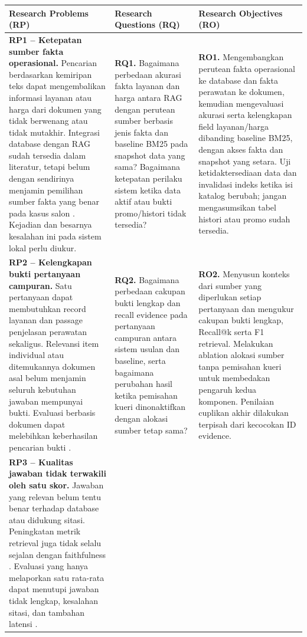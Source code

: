 \documentclass[11pt,a4paper]{article}
\newcommand{\rowcolor}[1]{}
\begin{document}
\begin{landscape}
\vspace{5pt}
\begin{tabularx}{\linewidth}{|>{\raggedright\arraybackslash}X|>{\raggedright\arraybackslash}X|>{\raggedright\arraybackslash}X|}
\hline
\rowcolor{headfill}\textbf{Research Problems (RP)} & \textbf{Research Questions (RQ)} & \textbf{Research Objectives (RO)}\\\hline
\textbf{RP1 -- Ketepatan sumber fakta operasional.}
Pencarian berdasarkan kemiripan teks dapat mengembalikan informasi layanan atau harga dari dokumen yang tidak berwenang atau tidak mutakhir. Integrasi database dengan RAG sudah tersedia dalam literatur, tetapi belum dengan sendirinya menjamin pemilihan sumber fakta yang benar pada kasus salon \cite{burbano,hsueh}. Kejadian dan besarnya kesalahan ini pada sistem lokal perlu diukur.
&
\textbf{RQ1.} Bagaimana perbedaan akurasi fakta layanan dan harga antara RAG dengan perutean sumber berbasis jenis fakta dan baseline BM25 pada snapshot data yang sama? Bagaimana ketepatan perilaku sistem ketika data aktif atau bukti promo/histori tidak tersedia?
&
\textbf{RO1.} Mengembangkan perutean fakta operasional ke database dan fakta perawatan ke dokumen, kemudian mengevaluasi akurasi serta kelengkapan field layanan/harga dibanding baseline BM25, dengan akses fakta dan snapshot yang setara. Uji ketidaktersediaan data dan invalidasi indeks ketika isi katalog berubah; jangan mengasumsikan tabel histori atau promo sudah tersedia.
\\\hline
\textbf{RP2 -- Kelengkapan bukti pertanyaan campuran.}
Satu pertanyaan dapat membutuhkan record layanan dan passage penjelasan perawatan sekaligus. Relevansi item individual atau ditemukannya dokumen asal belum menjamin seluruh kebutuhan jawaban mempunyai bukti. Evaluasi berbasis dokumen dapat melebihkan keberhasilan pencarian bukti \cite{topic,gao}.
&
\textbf{RQ2.} Bagaimana perbedaan cakupan bukti lengkap dan recall evidence pada pertanyaan campuran antara sistem usulan dan baseline, serta bagaimana perubahan hasil ketika pemisahan kueri dinonaktifkan dengan alokasi sumber tetap sama?
&
\textbf{RO2.} Menyusun konteks dari sumber yang diperlukan setiap pertanyaan dan mengukur cakupan bukti lengkap, Recall@k serta F1 retrieval. Melakukan ablation alokasi sumber tanpa pemisahan kueri untuk membedakan pengaruh kedua komponen. Penilaian cuplikan akhir dilakukan terpisah dari kecocokan ID evidence.
\\\hline
\textbf{RP3 -- Kualitas jawaban tidak terwakili oleh satu skor.}
Jawaban yang relevan belum tentu benar terhadap database atau didukung sitasi. Peningkatan metrik retrieval juga tidak selalu sejalan dengan faithfulness \cite{salman,es}. Evaluasi yang hanya melaporkan satu rata-rata dapat menutupi jawaban tidak lengkap, kesalahan sitasi, dan tambahan latensi \cite{knollmeyer,gao}.

\end{tabularx}
\end{landscape}
\end{document}
